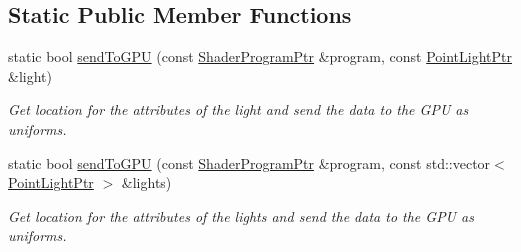 \subsection*{Static Public Member Functions}
\begin{DoxyCompactItemize}
\item 
static bool \hyperlink{classPointLight_a09784e83b307a49218362dedd46b3f45}{send\+To\+G\+P\+U} (const \hyperlink{ShaderProgram_8hpp_af8e4af1ad4c53875ee5d32ab7e1f4966}{Shader\+Program\+Ptr} \&program, const \hyperlink{classPointLight_a48c8893ebd8015da2cb3d552f800e4e7}{Point\+Light\+Ptr} \&light)
\begin{DoxyCompactList}\small\item\em Get location for the attributes of the light and send the data to the G\+P\+U as uniforms. \end{DoxyCompactList}\item 
static bool \hyperlink{classPointLight_a01a877269592617f8280ed9be418b612}{send\+To\+G\+P\+U} (const \hyperlink{ShaderProgram_8hpp_af8e4af1ad4c53875ee5d32ab7e1f4966}{Shader\+Program\+Ptr} \&program, const std\+::vector$<$ \hyperlink{classPointLight_a48c8893ebd8015da2cb3d552f800e4e7}{Point\+Light\+Ptr} $>$ \&lights)
\begin{DoxyCompactList}\small\item\em Get location for the attributes of the lights and send the data to the G\+P\+U as uniforms. \end{DoxyCompactList}\end{DoxyCompactItemize}
